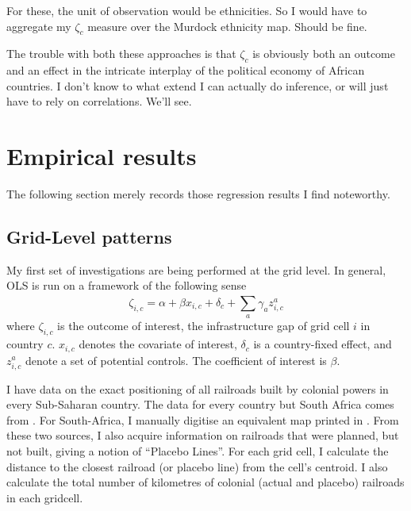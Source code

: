 \documentclass[11pt, oneside]{article}   	%
\begin{document}
For these, the unit of observation would be ethnicities. So I would have to aggregate my $\zeta_{c}$ measure over the Murdock ethnicity map. Should be fine.

The trouble with both these approaches is that $\zeta_{c}$ is obviously both an outcome and an effect in the intricate interplay of the political economy of African countries. I don't know to what extend I can actually do inference, or will just have to rely on correlations. We'll see.


\section{Empirical results}
The following section merely records those regression results I find noteworthy.
\subsection{Grid-Level patterns}
My first set of investigations are being performed at the grid level. In general, OLS is run on a framework of the following sense
\begin{equation}
  \zeta_{i,c} = \alpha + \beta x_{i,c} + \delta_{c} + \sum_{a}^{}\gamma_{a} z_{i,c}^{a}
  \label{eq:regression}
\end{equation}
where $\zeta_{i,c}$ is the outcome of interest, the infrastructure gap of grid cell $i$ in country $c$. $x_{i,c}$ denotes the covariate of interest, $\delta_{c}$ is a country-fixed effect, and $z_{i,c}^{a}$ denote a set of potential controls. The coefficient of interest is $\beta$.

I have data on the exact positioning of all railroads built by colonial powers in every Sub-Saharan country. The data for every country but South Africa comes from \cite{jedwab_permanent_2016}. For South-Africa, I manually digitise an equivalent map printed in \cite{Herranz-Loncan_publicbenefitRailways_2017}. From these two sources, I also acquire information on railroads that were planned, but not built, giving a notion of ``Placebo Lines''. For each grid cell, I calculate the distance to the closest railroad (or placebo line) from the cell's centroid. I also calculate the total number of kilometres of colonial (actual and placebo) railroads in each gridcell.
\end{document}
